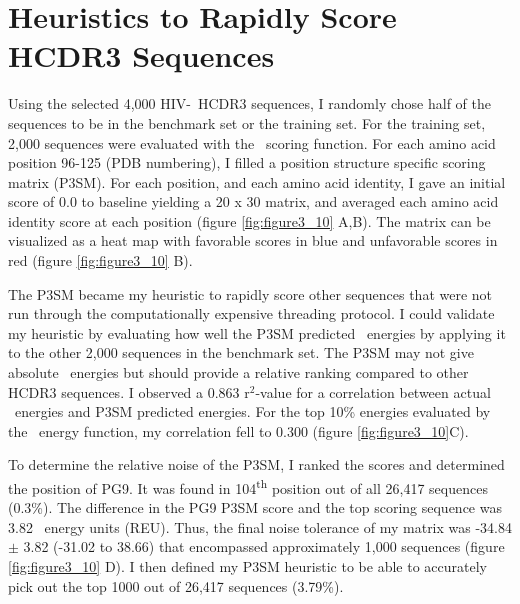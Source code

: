\section{Heuristics to Rapidly Score HCDR3 Sequences}
Using the selected 4,000 HIV-\naive~HCDR3 sequences, I randomly chose half of the sequences to be in the benchmark set or the training set. For the training set, 2,000 sequences were evaluated with the \rosetta~scoring function. For each amino acid position 96-125 (PDB numbering), I filled a position structure specific scoring matrix (P3SM). For each position, and each amino acid identity, I gave an initial score of 0.0 to baseline yielding a 20 x 30 matrix, and averaged each amino acid identity score at each position (figure \ref{fig:figure3_10} A,B). The matrix can be visualized as a heat map with favorable scores in blue and unfavorable scores in red (figure \ref{fig:figure3_10} B).

The P3SM became my heuristic to rapidly score other sequences that were not run through the computationally expensive threading protocol. I could validate my heuristic by evaluating how well the P3SM predicted \rosetta~energies by applying it to the other 2,000 sequences in the benchmark set. The P3SM may not give absolute \rosetta~energies but should provide a relative ranking compared to other HCDR3 sequences. I observed a 0.863 r$^{2}$-value for a correlation between actual \rosetta~energies and P3SM predicted energies. For the top 10\% energies evaluated by the \rosetta~energy function, my correlation fell to 0.300 (figure \ref{fig:figure3_10}C).

To determine the relative noise of the P3SM, I ranked the scores and determined the position of PG9. It was found in 104\textsuperscript{th} position out of all 26,417 sequences (0.3\%). The difference in the PG9 P3SM score and the top scoring sequence was 3.82 \rosetta~energy units (REU). Thus, the final noise tolerance of my matrix was -34.84 $\pm$ 3.82 (-31.02 to 38.66) that encompassed approximately 1,000 sequences (figure \ref{fig:figure3_10} D). I then defined my P3SM heuristic to be able to accurately pick out the top 1000 out of 26,417 sequences (3.79\%).

